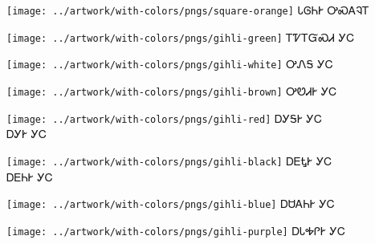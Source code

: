 \documentclass[avery5371]{flashcards}%
\begin{document}
    \begin{flashcard}{
        \texttt{[image: ../artwork/with-colors/pngs/square-orange]}
    }
        \Huge ᏓᎶᏂᎨ ᎤᏍᎪᎸᎢ
    \end{flashcard}


    \begin{flashcard}{
        \texttt{[image: ../artwork/with-colors/pngs/gihli-green]}
    }
        \Huge ᎢᏤᎢᏳᏍᏗ ᎩᏟ
    \end{flashcard}

    \begin{flashcard}{
        \texttt{[image: ../artwork/with-colors/pngs/gihli-white]}
    }
        \Huge ᎤᏁᎦ ᎩᏟ
    \end{flashcard}

    \begin{flashcard}{
        \texttt{[image: ../artwork/with-colors/pngs/gihli-brown]}
    }
        \Huge ᎤᏬᏗᎨ ᎩᏟ
    \end{flashcard}

    \begin{flashcard}{
        \texttt{[image: ../artwork/with-colors/pngs/gihli-red]}
    }
        \Huge ᎠᎩᎦᎨ ᎩᏟ\\ᎠᎩᎨ ᎩᏟ
    \end{flashcard}

    \begin{flashcard}{
        \texttt{[image: ../artwork/with-colors/pngs/gihli-black]}
    }
        \Huge ᎠᎬᎿᎨ ᎩᏟ\\ᎠᎬᏂᎨ ᎩᏟ
    \end{flashcard}

    \begin{flashcard}{
        \texttt{[image: ../artwork/with-colors/pngs/gihli-blue]}
    }
        \Huge ᎠᏌᎪᏂᎨ ᎩᏟ
    \end{flashcard}

    \begin{flashcard}{
        \texttt{[image: ../artwork/with-colors/pngs/gihli-purple]}
    }
        \Huge ᎠᏓᎭᎵᎨ ᎩᏟ
    \end{flashcard}
\end{document}
